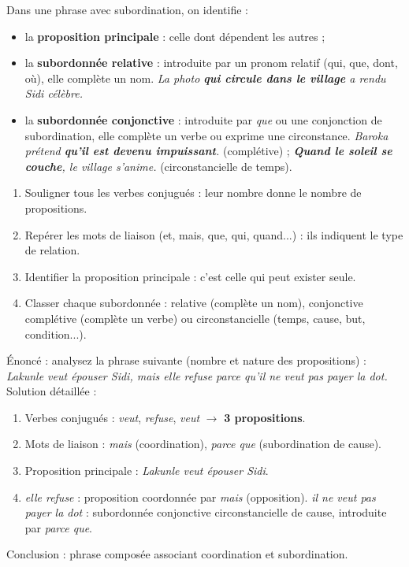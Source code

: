 \documentclass[11pt]{article}
\begin{document}
\begin{propriete}
Dans une phrase avec subordination, on identifie :
\begin{itemize}
\item la \textbf{proposition principale} : celle dont dépendent les autres ;
\item la \textbf{subordonnée relative} : introduite par un pronom relatif (qui, que, dont, où), elle complète un nom. \emph{La photo \textbf{qui circule dans le village} a rendu Sidi célèbre.}
\item la \textbf{subordonnée conjonctive} : introduite par \emph{que} ou une conjonction de subordination, elle complète un verbe ou exprime une circonstance. \emph{Baroka prétend \textbf{qu'il est devenu impuissant}.} (complétive) ; \emph{\textbf{Quand le soleil se couche}, le village s'anime.} (circonstancielle de temps).
\end{itemize}
\end{propriete}

\begin{methode}
\begin{enumerate}
\item Souligner tous les verbes conjugués : leur nombre donne le nombre de propositions.
\item Repérer les mots de liaison (et, mais, que, qui, quand...) : ils indiquent le type de relation.
\item Identifier la proposition principale : c'est celle qui peut exister seule.
\item Classer chaque subordonnée : relative (complète un nom), conjonctive complétive (complète un verbe) ou circonstancielle (temps, cause, but, condition...).
\end{enumerate}
\end{methode}

\begin{exoresolu}
Énoncé : analysez la phrase suivante (nombre et nature des propositions) : \emph{Lakunle veut épouser Sidi, mais elle refuse parce qu'il ne veut pas payer la dot.}
\tcblower
Solution détaillée :
\begin{enumerate}
\item Verbes conjugués : \emph{veut}, \emph{refuse}, \emph{veut} $\rightarrow$ \textbf{3 propositions}.
\item Mots de liaison : \emph{mais} (coordination), \emph{parce que} (subordination de cause).
\item Proposition principale : \emph{Lakunle veut épouser Sidi}.
\item \emph{elle refuse} : proposition coordonnée par \emph{mais} (opposition). \emph{il ne veut pas payer la dot} : subordonnée conjonctive circonstancielle de cause, introduite par \emph{parce que}.
\end{enumerate}
Conclusion : phrase composée associant coordination et subordination.
\end{exoresolu}
\end{document}
